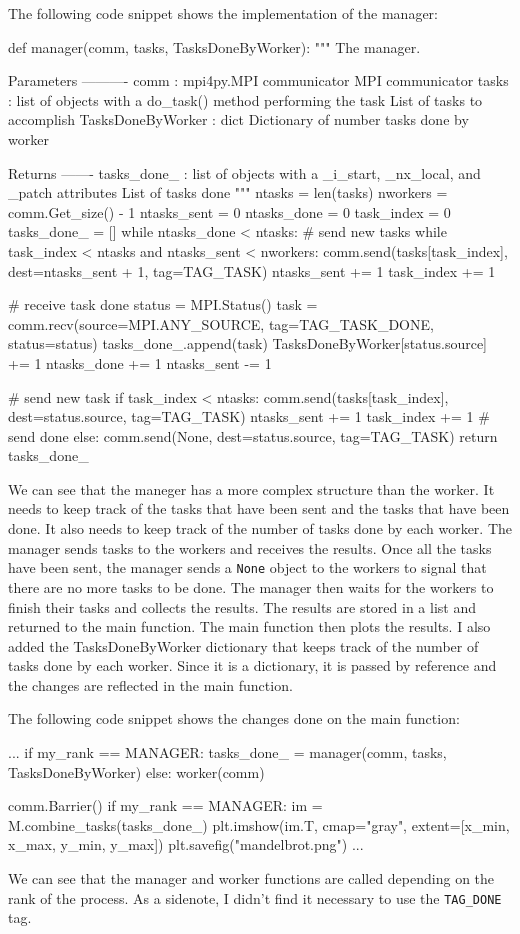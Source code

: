 \documentclass[unicode,11pt,a4paper,oneside,numbers=endperiod,openany]{scrartcl}
\begin{document}
The following code snippet shows the implementation of the manager:
\begin{pythonverbatim}
def manager(comm, tasks, TasksDoneByWorker):
"""
The manager.

Parameters
----------
comm : mpi4py.MPI communicator
    MPI communicator
tasks : list of objects with a do_task() method performing the task
    List of tasks to accomplish
TasksDoneByWorker : dict
    Dictionary of number tasks done by worker

Returns
-------
tasks_done_ : list of objects with a _i_start, _nx_local, and _patch
attributes
    List of tasks done
"""
ntasks = len(tasks)
nworkers = comm.Get_size() - 1
ntasks_sent = 0
ntasks_done = 0
task_index = 0
tasks_done_ = []
while ntasks_done < ntasks:
    # send new tasks
    while task_index < ntasks and ntasks_sent < nworkers:
        comm.send(tasks[task_index], dest=ntasks_sent + 1, tag=TAG_TASK)
        ntasks_sent += 1
        task_index += 1

    # receive task done
    status = MPI.Status()
    task = comm.recv(source=MPI.ANY_SOURCE,
                        tag=TAG_TASK_DONE, status=status)
    tasks_done_.append(task)
    TasksDoneByWorker[status.source] += 1
    ntasks_done += 1
    ntasks_sent -= 1

    # send new task
    if task_index < ntasks:
        comm.send(tasks[task_index], dest=status.source, tag=TAG_TASK)
        ntasks_sent += 1
        task_index += 1
    # send done
    else:
        comm.send(None, dest=status.source, tag=TAG_TASK)
return tasks_done_
\end{pythonverbatim}
We can see that the maneger has a more complex structure than the worker. It
needs to keep track of the tasks that have been sent and the tasks that have
been done. It also needs to keep track of the number of tasks done by each
worker. The manager sends tasks to the workers and receives the results. Once
all the tasks have been sent, the manager sends a \texttt{None} object to the
workers to signal that there are no more tasks to be done. The manager then
waits for the workers to finish their tasks and collects the results. The
results are stored in a list and returned to the main function. The main
function then plots the results. I also added the TasksDoneByWorker dictionary
that keeps track of the number of tasks done by each worker. Since it is a
dictionary, it is passed by reference and the changes are reflected in the main
function. 

The following code snippet shows the changes done on the main
function:
\begin{pythonverbatim}
...
if my_rank == MANAGER:
    tasks_done_ = manager(comm, tasks, TasksDoneByWorker)
else:
    worker(comm)

comm.Barrier()
if my_rank == MANAGER:
    im = M.combine_tasks(tasks_done_)
    plt.imshow(im.T, cmap="gray", extent=[x_min, x_max, y_min, y_max])
    plt.savefig("mandelbrot.png")
...
\end{pythonverbatim}
We can see that the manager and worker functions are called depending on the
rank of the process. As a sidenote, I didn't find it necessary to use the
\texttt{TAG\_DONE} tag.
\end{document}

